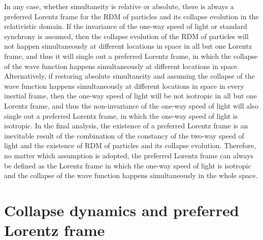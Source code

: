 In any case, whether simultaneity is relative or absolute, there is always a preferred Lorentz frame for the RDM of particles and its collapse evolution in the relativistic domain. 
If the invariance of the one-way speed of light or standard synchrony is assumed, then the collapse evolution of the RDM of particles will not happen simultaneously at different locations in space in all but one Lorentz frame, and thus it will  single out  a preferred Lorentz frame, in which the collapse of the wave function happens simultaneously at different locations in space.
Alternatively, if restoring absolute simultaneity and assuming the collapse of the wave function happens simultaneously at different locations in space in every inertial frame, then the one-way speed of light will be not isotropic in all but one Lorentz frame, and thus the non-invariance of the one-way speed of light will also single out a preferred Lorentz frame, in which the one-way speed of light is isotropic.
In the final analysis, the existence of a preferred Lorentz frame is an inevitable result of the combination of the constancy of the two-way speed of light and the existence of RDM of particles and its collapse evolution. Therefore, no matter which assumption is adopted, the preferred Lorentz frame can always be defined as the Lorentz frame in which the one-way speed of light is isotropic and the collapse of the wave function happens simultaneously in the whole space.


\section{Collapse dynamics and preferred Lorentz frame}

